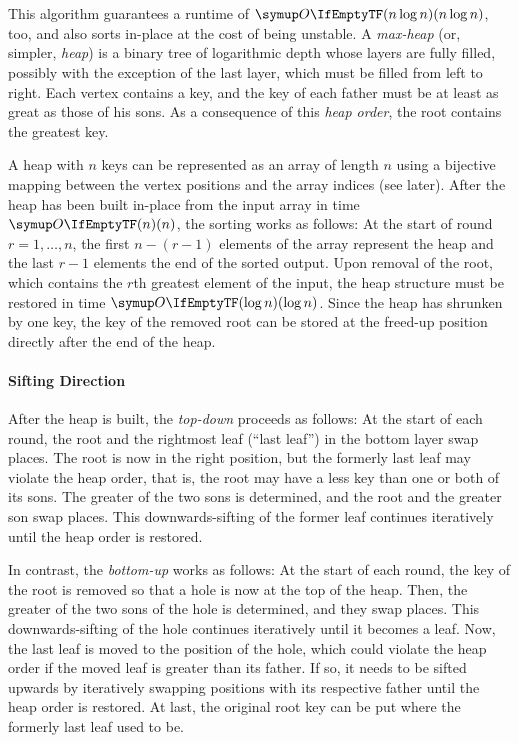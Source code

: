 \section{\texorpdfstring{\HS{}}{HeapSort}}
\label{sec:tasklet:heap}

This algorithm guarantees a runtime of \(\bigoh{n \log n}\), too, and also sorts in-place at the cost of being unstable.
A \emph{max-heap} (or, simpler, \emph{heap}) is a binary tree of logarithmic depth whose layers are fully filled, possibly with the exception of the last layer, which must be filled from left to right.
Each vertex contains a key, and the key of each father must be at least as great as those of his sons.
As a consequence of this \emph{heap order}, the root contains the greatest key.

A heap with \(n\) keys can be represented as an array of length \(n\) using a bijective mapping between the vertex positions and the array indices (see later).
After the heap has been built in-place from the input array in time \(\bigoh{n}\), the sorting works as follows:
At the start of round \(r = 1, \dots, n\), the first \(n - (r - 1)\) elements of the array represent the heap and the last \(r - 1\) elements the end of the sorted output.
Upon removal of the root, which contains the \(r\)th greatest element of the input, the heap structure must be restored in time \(\bigoh{\log n}\).
Since the heap has shrunken by one key, the key of the removed root can be stored at the freed-up position directly after the end of the heap.

\paragraph{Sifting Direction}
After the heap is built, the \emph{top-down} \HS{} proceeds as follows:
At the start of each round, the root and the rightmost leaf (\enquote{last leaf}) in the bottom layer swap places.
The root is now in the right position, but the formerly last leaf may violate the heap order, that is, the root may have a less key than one or both of its sons.
The greater of the two sons is determined, and the root and the greater son swap places.
This downwards-sifting of the former leaf continues iteratively until the heap order is restored.

In contrast, the \emph{bottom-up} \HS{} \cite{wegener1993heapsort} works as follows:
At the start of each round, the key of the root is removed so that a hole is now at the top of the heap.
Then, the greater of the two sons of the hole is determined, and they swap places.
This downwards-sifting of the hole continues iteratively until it becomes a leaf.
Now, the last leaf is moved to the position of the hole, which could violate the heap order if the moved leaf is greater than its father.
If so, it needs to be sifted upwards by iteratively swapping positions with its respective father until the heap order is restored.
At last, the original root key can be put where the formerly last leaf used to be.


